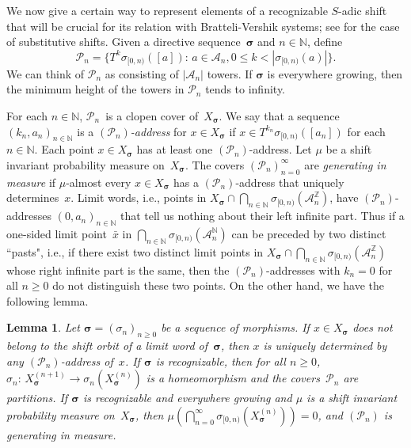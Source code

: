 \documentclass{amsart}
\newtheorem{lemma}{Lemma}[section]
\theoremstyle{definition}
\theoremstyle{remark}
\numberwithin{equation}{section}
\begin{document}
We now give a certain way to represent elements of a recognizable $S$-adic shift that will be crucial for its relation with Bratteli-Vershik systems; see \cite{CS01b} for the case of substitutive shifts. 
Given a directive sequence~$\boldsymbol{\sigma}$ and $n\in \mathbb N$, define 
\begin{equation}\label{eq:partisadic}
\mathcal{P}_n = \{ T^k \sigma_{[0,n)}([a]):\, a \in \mathcal{A}_{n}, 0\leq k<|\sigma_{[0,n)}(a)| \}.
\end{equation}
We can think of $\mathcal{P}_n$ as consisting of $ |\mathcal A_n|$ towers. 
If ${\boldsymbol{\sigma}}$ is everywhere growing, then the minimum height of the towers in $\mathcal{P}_n$ tends to infinity.

For each $n\in \mathbb{N}$, $\mathcal{P}_n$~is a clopen cover of~$X_{\boldsymbol{\sigma}}$. We say that a sequence $(k_n, a_n)_{n\in\mathbb N}$ is a \emph{$(\mathcal{P}_n)$-address} for $x \in X_{\boldsymbol{\sigma}}$  if   $x\in T^{k_n} \sigma_{[0,n)}([a_n])$ for each $n\in \mathbb N$.    Each point $x \in X_{\boldsymbol{\sigma}}$ has at least one $(\mathcal{P}_n)$-address.
Let $\mu$ be  a shift invariant probability measure on~$X_{\boldsymbol{\sigma}}$.
The covers $(\mathcal{P}_n)_{n=0}^{\infty}$ are \emph{generating in  measure} if $\mu$-almost every $x \in X_{\boldsymbol{\sigma}}$ has a $(\mathcal{P}_n)$-address that uniquely determines~$x$. 
Limit words, i.e., points in $X_{\boldsymbol{\sigma}} \cap \bigcap_{n\in\mathbb{N}} \sigma_{[0,n)}(\mathcal{A}_n^\mathbb{Z})$, have $(\mathcal{P}_n)$-addresses $(0,a_n)_{n\in \mathbb N}$ that tell us nothing about their left infinite part. 
Thus if a one-sided limit point~$\bar{x}$ in $\bigcap_{n\in\mathbb{N}} \sigma_{[0,n)}(\mathcal{A}_n^\mathbb{N})$ can be preceded by two distinct ``pasts", i.e., if there exist two distinct limit points in $X_{\boldsymbol{\sigma}} \cap \bigcap_{n\in\mathbb{N}} \sigma_{[0,n)}(\mathcal{A}_n^\mathbb{Z})$ whose right infinite part is the same, then the $(\mathcal{P}_n)$-addresses with $k_n=0$ for all $n \ge 0$ do not distinguish these two points. 
On the other hand, we have the following lemma.

\begin{lemma}\label{l:generating}
Let $\boldsymbol{\sigma} = (\sigma_n)_{n\ge0}$ be a sequence of morphisms. 
If $x \in X_{\boldsymbol{\sigma}}$ does not belong to the shift orbit of a limit word of~$\boldsymbol{\sigma}$, then $x$ is uniquely determined by any $(\mathcal{P}_n)$-address of~$x$.
If $\boldsymbol{\sigma}$ is recognizable, then for all $n \ge 0$, $\sigma_n:\, X_{\boldsymbol{\sigma}}^{(n+1)} \to \sigma_n(X_{\boldsymbol{\sigma}}^{(n)})$ is a homeomorphism and the covers~$\mathcal{P}_n$ are partitions. 
If $\boldsymbol{\sigma}$ is recognizable and everywhere growing and $\mu$ is a shift invariant probability measure on~$X_{\boldsymbol{\sigma}}$, then $\mu(\bigcap_{n=0}^{\infty} \sigma_{[0,n)}(X_{\boldsymbol{\sigma}}^{(n)})) = 0$, and $(\mathcal P_n)$ is generating in measure.
\end{lemma}
\end{document}
